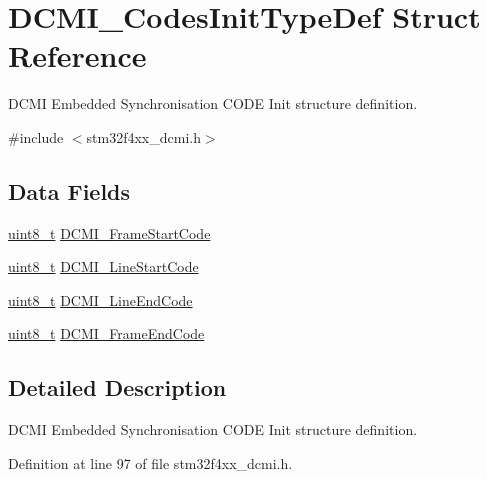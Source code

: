 \hypertarget{struct_d_c_m_i___codes_init_type_def}{\section{D\-C\-M\-I\-\_\-\-Codes\-Init\-Type\-Def Struct Reference}
\label{struct_d_c_m_i___codes_init_type_def}
}


D\-C\-M\-I Embedded Synchronisation C\-O\-D\-E Init structure definition.  




{\ttfamily \#include $<$stm32f4xx\-\_\-dcmi.\-h$>$}

\subsection*{Data Fields}
\begin{DoxyCompactItemize}
\item 
\hyperlink{stdint_8h_aba7bc1797add20fe3efdf37ced1182c5}{uint8\-\_\-t} \hyperlink{struct_d_c_m_i___codes_init_type_def_a3b8da4e40e51dfd9641e8cb729fb1ffa}{D\-C\-M\-I\-\_\-\-Frame\-Start\-Code}
\item 
\hyperlink{stdint_8h_aba7bc1797add20fe3efdf37ced1182c5}{uint8\-\_\-t} \hyperlink{struct_d_c_m_i___codes_init_type_def_a52df641c10fe4fb79eefa2db68c65f49}{D\-C\-M\-I\-\_\-\-Line\-Start\-Code}
\item 
\hyperlink{stdint_8h_aba7bc1797add20fe3efdf37ced1182c5}{uint8\-\_\-t} \hyperlink{struct_d_c_m_i___codes_init_type_def_a5d609eda1abbf53705d5d20a1bdabccc}{D\-C\-M\-I\-\_\-\-Line\-End\-Code}
\item 
\hyperlink{stdint_8h_aba7bc1797add20fe3efdf37ced1182c5}{uint8\-\_\-t} \hyperlink{struct_d_c_m_i___codes_init_type_def_a1feb31acae8822c64ed5541b6da8f7e1}{D\-C\-M\-I\-\_\-\-Frame\-End\-Code}
\end{DoxyCompactItemize}


\subsection{Detailed Description}
D\-C\-M\-I Embedded Synchronisation C\-O\-D\-E Init structure definition. 

Definition at line 97 of file stm32f4xx\-\_\-dcmi.\-h.



